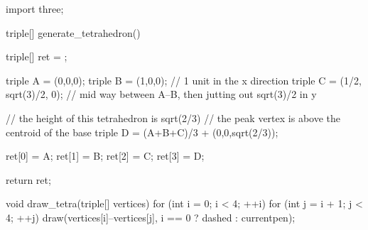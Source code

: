 \documentclass[../gatm_answers.tex]{subfiles}
\begin{document}
\begin{asydef}
import three;

triple[] generate_tetrahedron() {
	triple[] ret = {};
	
	triple A = (0,0,0);
	triple B = (1,0,0); // 1 unit in the x direction
	triple C = (1/2, sqrt(3)/2, 0); // mid way between A--B, then jutting out sqrt(3)/2 in y
	
	// the height of this tetrahedron is sqrt(2/3)
	// the peak vertex is above the centroid of the base
	triple D = (A+B+C)/3 + (0,0,sqrt(2/3));
	
	ret[0] = A;
	ret[1] = B;
	ret[2] = C;
	ret[3] = D;
	
	return ret;
}

void draw_tetra(triple[] vertices) {
	for (int i = 0; i < 4; ++i) {
		for (int j = i + 1; j < 4; ++j) {
			draw(vertices[i]--vertices[j], i == 0 ? dashed : currentpen);
		}
	}
}

\end{asydef}
\end{document}
